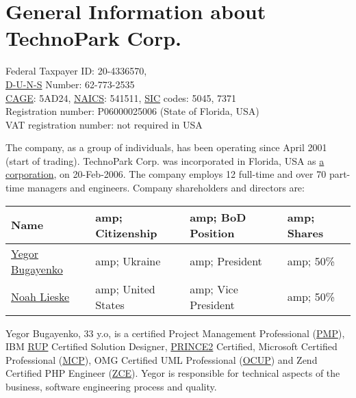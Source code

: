 
\section*{General Information about TechnoPark Corp.}

Federal Taxpayer ID: 20-4336570, \\
\href{https://smallbusiness.dnb.com}{D-U-N-S} Number: 62-773-2535 \\
\href{http://www.dlis.dla.mil/cage_welcome.asp}{CAGE}: 5AD24, 
	\href{http://www.census.gov/eos/www/naics/}{NAICS}: 541511, 
	\href{http://www.osha.gov/pls/imis/sicsearch.html}{SIC} codes: 5045, 7371 \\
Registration number: P06000025006 (State of Florida, USA) \\
VAT registration number: not required in USA

The company, as a group of individuals, has been operating since April 2001 (start of trading). 
TechnoPark Corp. was incorporated in Florida, USA as 
\href{http://en.wikipedia.org/wiki/Corporation}{a corporation}, on 20-Feb-2006.
The company employs 12 full-time and over 70 part-time managers and engineers.
Company shareholders and directors are:

\begin{tabular}{llll}
Name &amp; 		Citizenship &amp; 	BoD Position &amp; 	Shares \\
\hline
\href{mailto:egor@technoparkcorp.com}{Yegor Bugayenko}	&amp; 	Ukraine &amp;		President &amp; 	50\% \\
\href{mailto:noah@technoparkcorp.com}{Noah Lieske} &amp;	United States &amp; 	Vice President &amp; 	50\% \\
\end{tabular}

Yegor Bugayenko, 33 y.o, is a certified 
Project Management Professional (\href{http://en.wikipedia.org/wiki/Project_Management_Professional}{PMP}), 
IBM \href{http://www-03.ibm.com/certify/certs/38008003.shtml}{RUP} Certified Solution Designer, 
\href{http://www.prince2.com/}{PRINCE2} Certified,
Microsoft Certified Professional (\href{http://www.microsoft.com/learning/mcp/mcp/}{MCP}), 
OMG Certified UML Professional (\href{http://www.omg.org/uml-certification/}{OCUP}) and 
Zend Certified PHP Engineer (\href{http://www.zend.com/en/services/certification/}{ZCE}).
Yegor is responsible for technical aspects of the business, software engineering process
and quality.

